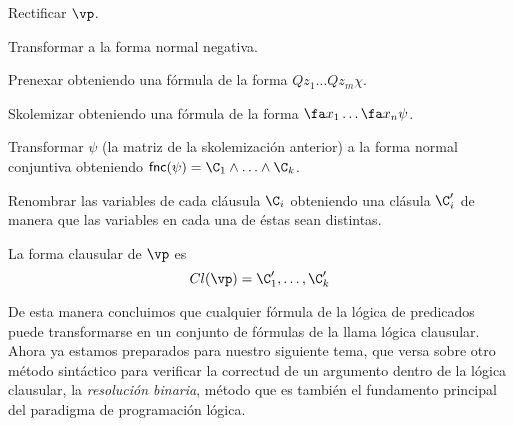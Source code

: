 \documentclass[11pt,letterpaper]{article}
\begin{document}
\be
\item Rectificar $\vp$.
\item Transformar a la forma normal negativa.
\item Prenexar obteniendo una fórmula de la forma $Q z_1\ldots Q z_m\chi$.
\item Skolemizar obteniendo una fórmula de la forma $\fa x_1\ldots\fa x_n\psi$.
\item Transformar $\psi$ (la matriz de la skolemización anterior) a la forma 
normal conjuntiva obteniendo $\mathsf{fnc}(\psi)=\C_1\land\ldots\land\C_k$.
\item Renombrar las variables de cada cláusula $\C_i$ obteniendo una clásula 
$\C_i'$ de manera que las variables en cada una de éstas sean distintas.
\item La forma clausular de $\vp$ es
$$ Cl(\vp)=\C_1',\ldots,\C_k' $$
\ee


De esta manera concluimos que cualquier fórmula de la lógica de predicados puede 
transformarse en un conjunto de fórmulas de la llama lógica clausular.\\

Ahora ya estamos preparados para nuestro siguiente tema, que versa sobre otro 
método sintáctico para verificar la correctud de un argumento dentro de la 
lógica clausular, la {\em resolución binaria}, método que es también el 
fundamento principal del paradigma de programación lógica.
\end{document}
